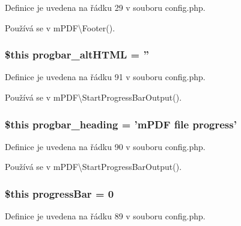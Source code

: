 Definice je uvedena na řádku 29 v souboru config.\-php.



Používá se v m\-P\-D\-F\textbackslash{}\-Footer().

\hypertarget{config_8php_a57e965ae11e0915345d997eba69b6f35}{
\subsubsection[{progbar\-\_\-alt\-H\-T\-M\-L}]{\setlength{\rightskip}{0pt plus 5cm}\$this progbar\-\_\-alt\-H\-T\-M\-L = ''}}\label{config_8php_a57e965ae11e0915345d997eba69b6f35}


Definice je uvedena na řádku 91 v souboru config.\-php.



Používá se v m\-P\-D\-F\textbackslash{}\-Start\-Progress\-Bar\-Output().

\hypertarget{config_8php_a57aaaa91906b971f09182e61642d74fe}{
\subsubsection[{progbar\-\_\-heading}]{\setlength{\rightskip}{0pt plus 5cm}\$this progbar\-\_\-heading = '{\bf m\-P\-D\-F} file progress'}}\label{config_8php_a57aaaa91906b971f09182e61642d74fe}


Definice je uvedena na řádku 90 v souboru config.\-php.



Používá se v m\-P\-D\-F\textbackslash{}\-Start\-Progress\-Bar\-Output().

\hypertarget{config_8php_a95308f164277947b7b95abd2e6c5f6ee}{
\subsubsection[{progress\-Bar}]{\setlength{\rightskip}{0pt plus 5cm}\$this progress\-Bar = 0}}\label{config_8php_a95308f164277947b7b95abd2e6c5f6ee}


Definice je uvedena na řádku 89 v souboru config.\-php.



